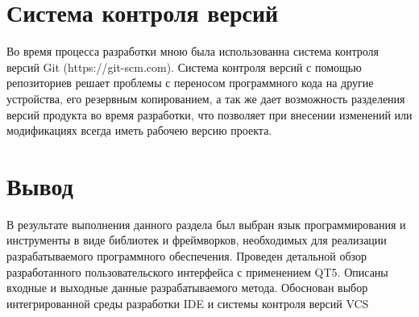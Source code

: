 \section{Система контроля версий}
Во время процесса разработки мною была использованна система контроля версий Git (https://git-scm.com). 
Система контроля версий с помощью репозиториев решает проблемы с переносом программного кода на другие устройства, его резервным копированием, а так же дает возможность разделения версий продукта во время разработки, что позволяет при внесении изменений или модификациях всегда иметь рабочею версию проекта.

\section{Вывод}
В результате выполнения данного раздела был выбран язык программирования и инструменты в виде библиотек и фреймворков, необходимых для реализации разрабатываемого программного обеспечения.
Проведен детальной обзор разработанного пользовательского интерфейса с применением QT5.
Описаны входные и выходные данные разрабатываемого метода.
Обоснован выбор интегрированной среды разработки IDE и системы контроля версий VCS
